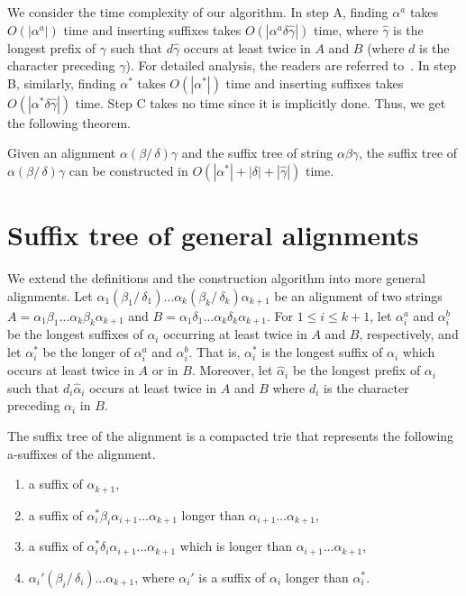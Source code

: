 \documentclass{llncs}
\newcommand{\partitle}[1]{}                        \newcommand{\commentout}[1]{}
\newcommand{\be}{\begin{enumerate}}
\newcommand{\ee}{\end{enumerate}}
\begin{document}
\partitle{time complexity}

We consider the time complexity of our algorithm.
In step A, finding $\alpha^{a}$ takes $O(|\alpha^{a}|)$ time
 and inserting suffixes takes $O(|\alpha^{a}\delta\hat{\gamma}|)$ time,
 where $\hat{\gamma}$ is the longest prefix of $\gamma$ such that
 $d\hat{\gamma}$ occurs at least twice in $A$ and $B$
 (where $d$ is the character preceding $\gamma$).
For detailed analysis, the readers are referred to~\cite{McCreight:76}.
In step B, similarly, finding $\alpha^{*}$ takes $O(|\alpha^{*}|)$ time
 and inserting suffixes takes $O(|\alpha^{*}\delta\hat{\gamma}|)$ time.
Step C takes no time since it is implicitly done.
Thus, we get the following theorem.

\begin{theorem}
Given an alignment $\alpha (\beta /\, \delta) \gamma$
 and the suffix tree of string $\alpha \beta \gamma$,
 the suffix tree of $\alpha (\beta /\, \delta) \gamma$
can be constructed in $O(|\alpha^{*}| + |\delta| + |\hat{\gamma}|)$ time.
\end{theorem}





\section{Suffix tree of general alignments}
\label{sec:ST-general-A}


\partitle{Input strings}
We extend the definitions and the construction algorithm
into more general alignments.
Let $\alpha_1 (\beta_1 /\, \delta_1) \ldots \alpha_k (\beta_k /\, \delta_k) \alpha_{k+1}$
 be an alignment of two strings
 $A=\alpha_1 \beta_1 \ldots \alpha_k \beta_k \alpha_{k+1}$ and
 $B= \alpha_1 \delta_1 \ldots \alpha_k \delta_k \alpha_{k+1}$.
For $1\le i \le k+1$,
 let $\alpha^{a}_{i}$ and $\alpha^{b}_{i}$ be the longest suffixes of $\alpha_i$
 occurring at least twice in $A$ and $B$, respectively,
 and let $\alpha^{*}_{i}$ be the longer of $\alpha^{a}_{i}$ and $\alpha^{b}_{i}$.
That is, $\alpha^{*}_{i}$  is the longest suffix of $\alpha_{i}$
 which occurs at least twice in $A$ or in $B$.
Moreover, let $\hat{\alpha}_{i}$ be the longest prefix of $\alpha_{i}$ such that
 $d_{i}\hat{\alpha}_{i}$ occurs at least twice in $A$ and $B$
 where $d_{i}$ is the character preceding $\alpha_{i}$ in $B$.

The suffix tree of the alignment is a compacted trie
 that represents the following a-suffixes of the alignment.
\be
\item a suffix of $\alpha_{k+1}$,
\item a suffix of $\alpha^{*}_i \beta_i \alpha_{i+1}\ldots\alpha_{k+1}$
         longer than $\alpha_{i+1}\ldots\alpha_{k+1}$,
\item a suffix of $\alpha^{*}_i \delta_i \alpha_{i+1}\ldots\alpha_{k+1}$
         which is longer than $\alpha_{i+1}\ldots\alpha_{k+1}$,
\item $\alpha_{i}' (\beta_i /\, \delta_i) \ldots \alpha_{k+1}$,
        where $\alpha_{i}'$ is a suffix of $\alpha_{i}$ longer than $\alpha^{*}_{i}$.
\ee
\end{document}
